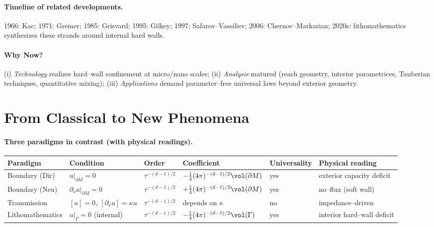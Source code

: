 \paragraph{Timeline of related developments.}
1966: Kac; 1971: Greiner; 1985: Grisvard; 1995: Gilkey; 1997: Safarov–Vassiliev; 2006: Chernov–Markarian; 2020s: lithomathematics synthesizes these strands around internal hard walls.

\paragraph{Why Now?}
(i) \emph{Technology} realizes hard–wall confinement at micro/nano scales; (ii) \emph{Analysis} matured (reach geometry, interior parametrices, Tauberian techniques, quantitative mixing); (iii) \emph{Applications} demand parameter–free universal laws beyond exterior geometry.

\medskip

\section{From Classical to New Phenomena}\label{sec:classical-new}

\paragraph{Three paradigms in contrast (with physical readings).}
\begin{center}
\renewcommand{\arraystretch}{1.15}
\begin{tabular}{|l|l|l|l|l|l|}
\hline
\textbf{Paradigm} & \textbf{Condition} & \textbf{Order} & \textbf{Coefficient} & \textbf{Universality} & \textbf{Physical reading} \\
\hline
Boundary (Dir) & $u|_{\partial M}=0$ & $\tau^{-(d-1)/2}$ & $-\tfrac14(4\pi)^{-(d-1)/2}\vol(\partial M)$ & yes & exterior capacity deficit \\
\hline
Boundary (Neu) & $\partial_\nu u|_{\partial M}=0$ & $\tau^{-(d-1)/2}$ & $+\tfrac14(4\pi)^{-(d-1)/2}\vol(\partial M)$ & yes & no–flux (soft wall) \\
\hline
Transmission & $[u]=0,\ [\partial_\nu u]=\kappa u$ & $\tau^{-(d-1)/2}$ & depends on $\kappa$ & no & impedance–driven \\
\hline
Lithomathematics & $u|_{\Gamma}=0$ (internal) & $\tau^{-(d-1)/2}$ & $-\tfrac14(4\pi)^{-(d-1)/2}\vol(\Gamma)$ & yes & interior hard–wall deficit \\
\hline
\end{tabular}
\end{center}

